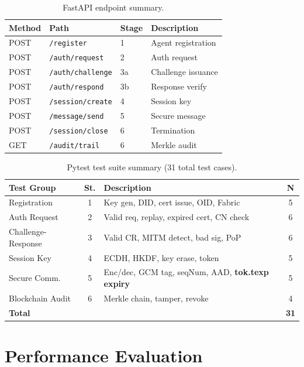 \documentclass[review,5p,twocolumn,times]{elsarticle}
\begin{document}
\begin{table}[H]
\centering
\caption{FastAPI endpoint summary.}
\label{tab:api}
\small
\begin{tabular}{@{}llll@{}}
\toprule
\textbf{Method} & \textbf{Path} & \textbf{Stage}
  & \textbf{Description}\\
\midrule
POST & \texttt{/register}       & 1 & Agent registration\\
POST & \texttt{/auth/request}   & 2 & Auth request\\
POST & \texttt{/auth/challenge} & 3a & Challenge issuance\\
POST & \texttt{/auth/respond}   & 3b & Response verify\\
POST & \texttt{/session/create} & 4 & Session key\\
POST & \texttt{/message/send}   & 5 & Secure message\\
POST & \texttt{/session/close}  & 6 & Termination\\
GET  & \texttt{/audit/trail}    & 6 & Merkle audit\\
\bottomrule
\end{tabular}
\end{table}

\begin{table}[H]
\centering
\caption{Pytest test suite summary (31 total test cases).}
\label{tab:tests}
\small
\begin{tabular}{@{}lcp{4.0cm}c@{}}
\toprule
\textbf{Test Group} & \textbf{St.} & \textbf{Description} & \textbf{N}\\
\midrule
Registration       & 1 & Key gen, DID, cert issue, OID, Fabric  & 5\\
Auth Request       & 2 & Valid req, replay, expired cert, CN check & 6\\
Challenge-Response & 3 & Valid CR, MITM detect, bad sig, PoP & 6\\
Session Key        & 4 & ECDH, HKDF, key erase, token & 5\\
Secure Comm.       & 5 & Enc/dec, GCM tag, seqNum, AAD, \textbf{tok.texp expiry} & 5\\
Blockchain Audit   & 6 & Merkle chain, tamper, revoke & 4\\
\midrule
\textbf{Total} & & & \textbf{31}\\
\bottomrule
\end{tabular}
\end{table}

\section{Performance Evaluation}\label{sec:eval}
\end{document}
